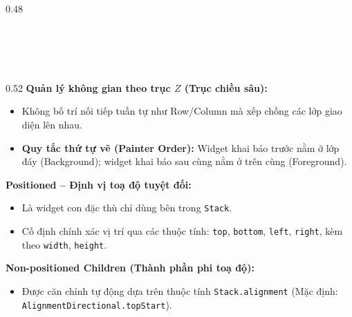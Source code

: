 \documentclass[aspectratio=169, 10pt]{beamer}
\newcommand{\SlideHeader}[2]{%
  \noindent{\textcolor{AccentOrange}{\textbf{\footnotesize #1}}}\\[0.08cm]
  \noindent{\Large \textbf{\textcolor{NavyTitle}{#2}}}\\[0.22cm]
}
\begin{document}
\begin{frame}
\begin{columns}[T]
\begin{column}{0.48\textwidth}
    \end{column}
  \end{columns}
\end{frame}

\begin{frame}
  \SlideHeader{CƠ SỞ LÝ THUYẾT}{Bố Cục Xếp Lớp Đa Chiều: Stack \& Positioned}

  \begin{columns}[T]
    \begin{column}{0.52\textwidth}
      \textbf{Quản lý không gian theo trục $Z$ (Trục chiều sâu):}
      \begin{itemize}
        \item Không bố trí nối tiếp tuần tự như Row/Column mà xếp chồng các lớp giao diện lên nhau.
        \item \textbf{Quy tắc thứ tự vẽ (Painter Order):} Widget khai báo trước nằm ở lớp đáy (Background); widget khai báo sau cùng nằm ở trên cùng (Foreground).
      \end{itemize}

      \vspace{0.15cm}
      \textbf{Positioned -- Định vị toạ độ tuyệt đối:}
      \begin{itemize}
        \item Là widget con đặc thù chỉ dùng bên trong \texttt{Stack}.
        \item Cố định chính xác vị trí qua các thuộc tính: \texttt{top}, \texttt{bottom}, \texttt{left}, \texttt{right}, kèm theo \texttt{width}, \texttt{height}.
      \end{itemize}

      \vspace{0.15cm}
      \textbf{Non-positioned Children (Thành phần phi toạ độ):}
      \begin{itemize}
        \item Được căn chỉnh tự động dựa trên thuộc tính \texttt{Stack.alignment} (Mặc định: \texttt{AlignmentDirectional.topStart}).
      \end{itemize}
    \end{column}


\end{columns}
\end{frame}
\end{document}
